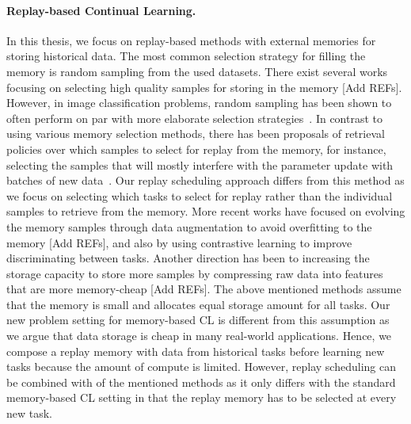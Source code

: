 \vspace{-3mm}
\paragraph{Replay-based Continual Learning.} In this thesis, we focus on replay-based methods with external memories for storing historical data. The most common selection strategy for filling the memory is random sampling from the used datasets. There exist several works focusing on selecting high quality samples for storing in the memory [Add REFs]. However, in image classification problems, random sampling has been shown to often perform on par with more elaborate selection strategies~\cite{chaudhry2018riemannian, hayes2020remind}. In contrast to using various memory selection methods, there has been proposals of retrieval policies over which samples to select for replay from the memory, for instance, selecting the samples that will mostly interfere with the parameter update with batches of new data~\cite{aljundi2019online}. Our replay scheduling approach differs from this method as we focus on selecting which tasks to select for replay rather than the individual samples to retrieve from the memory.  
More recent works have focused on evolving the memory samples through data augmentation to avoid overfitting to the memory [Add REFs], and also by using contrastive learning to improve discriminating between tasks. Another direction has been to increasing the storage capacity to store more samples by compressing raw data into features that are more memory-cheap [Add REFs]. The above mentioned methods assume that the memory is small and allocates equal storage amount for all tasks. Our new problem setting for memory-based CL is different from this assumption as we argue that data storage is cheap in many real-world applications. Hence, we compose a replay memory with data from historical tasks before learning new tasks because the amount of compute is limited. However, replay scheduling can be combined with of the mentioned methods as it only differs with the standard memory-based CL setting in that the replay memory has to be selected at every new task. 

\vspace{-3mm}
